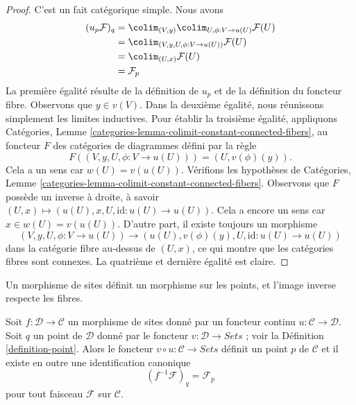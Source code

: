 \begin{proof}
C’est un fait catégorique simple. Nous avons
\begin{align*}
(u_p\mathcal{F})_q
& =
\colim_{(V, y)} \colim_{U, \phi : V \to u(U)} \mathcal{F}(U) \\
& = \colim_{(V, y, U, \phi : V \to u(U))} \mathcal{F}(U) \\
& = \colim_{(U, x)} \mathcal{F}(U) \\
& = \mathcal{F}_p
\end{align*}
La première égalité résulte de la définition de $u_p$ et de la
définition du foncteur fibre. Observons que $y \in v(V)$.
Dans la deuxième égalité, nous réunissons simplement les limites inductives.
Pour établir la troisième égalité, appliquons
Catégories, Lemme \ref{categories-lemma-colimit-constant-connected-fibers},
au foncteur $F$ des catégories de diagrammes défini par la règle
$$
F((V, y, U, \phi : V \to u(U))) = (U, v(\phi)(y)).
$$
Cela a un sens car $w(U) = v(u(U))$. Vérifions les hypothèses de
Catégories, Lemme \ref{categories-lemma-colimit-constant-connected-fibers}.
Observons que $F$ possède un inverse à droite, à savoir
$(U, x) \mapsto (u(U), x, U, \text{id} : u(U) \to u(U))$.
Cela a encore un sens car $x \in w(U) = v(u(U))$. D’autre part,
il existe toujours un morphisme
$$
(V, y, U, \phi : V \to u(U))
\longrightarrow
(u(U), v(\phi)(y), U, \text{id} : u(U) \to u(U))
$$
dans la catégorie fibre au-dessus de $(U, x)$, ce qui montre que les catégories fibres
sont connexes. La quatrième et dernière égalité est claire.
\end{proof}

\begin{lemma}
\label{lemma-point-morphism-sites}
\begin{slogan}
Un morphisme de sites définit un morphisme sur les points, et l’image inverse respecte les fibres.
\end{slogan}
Soit $f : \mathcal{D} \to \mathcal{C}$ un morphisme de sites
donné par un foncteur continu $u : \mathcal{C} \to \mathcal{D}$.
Soit $q$ un point de $\mathcal{D}$ donné par le foncteur
$v : \mathcal{D} \to \textit{Sets}$ ; voir la
Définition \ref{definition-point}.
Alors le foncteur $v \circ u : \mathcal{C} \to \textit{Sets}$
définit un point $p$ de $\mathcal{C}$ et il existe en outre
une identification canonique
$$
(f^{-1}\mathcal{F})_q = \mathcal{F}_p
$$
pour tout faisceau $\mathcal{F}$ sur $\mathcal{C}$.
\end{lemma}

